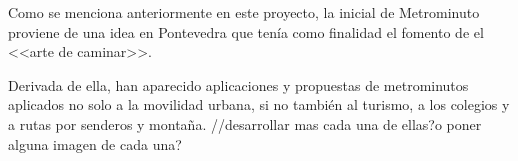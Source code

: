 
Como se menciona anteriormente en este proyecto, la inicial de Metrominuto proviene de una idea en Pontevedra que tenía como finalidad el fomento de el <<arte de caminar>>.


Derivada de ella, han aparecido aplicaciones y propuestas de metrominutos aplicados no solo a la movilidad urbana, si no también al turismo, a los colegios y a rutas por senderos y montaña.
//desarrollar mas cada una de ellas?o poner alguna imagen de cada una?

